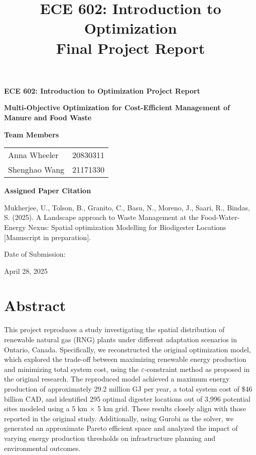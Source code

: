 \documentclass[12pt]{article}
\title{\textbf{ECE 602: Introduction to Optimization} \\ Final Project Report}
\date{}
\begin{document}
\begin{titlepage}
  \centering
  \vspace*{2cm}
  
  {\LARGE\bfseries ECE 602: Introduction to Optimization Project Report \par}
  \vspace{0.5cm}
  {\Large\bfseries Multi-Objective Optimization for Cost-Efficient Management of Manure and Food Waste \par}
  \vspace{2cm}
  
  {\large\bfseries Team Members\par}
  \vspace{0.5cm}
  \begin{tabular}{ll}
  Anna Wheeler & 20830311 \\
  Shenghao Wang & 21171330 \\

  \end{tabular}
  
  \vspace{2cm}
  
  {\large\bfseries Assigned Paper Citation\par}
  \vspace{0.5cm}
  \begin{minipage}{0.8\textwidth}
  \centering
  Mukherjee, U., Tolson, B., Granito, C., Basu, N., Moreno, J., Saari, R., Bindas, S. (2025). A Landscape approach to Waste Management at the Food-Water-Energy Nexus: Spatial optimization Modelling for Biodigester Locations [Manuscript in preparation].
  \end{minipage}
  
  \vfill
  
  {\large Date of Submission: \par}
  \vspace{0.5cm}
  {\large April 28, 2025\par}
  
\end{titlepage}

\section*{Abstract}
This project reproduces a study investigating the spatial distribution of renewable natural gas (RNG) plants under different adaptation scenarios in Ontario, Canada. Specifically, we reconstructed the original optimization model, which explored the trade-off between maximizing renewable energy production and minimizing total system cost, using the $\varepsilon$-constraint method as proposed in the original research. The reproduced model achieved a maximum energy production of approximately 29.2 million GJ per year, a total system cost of \$46 billion CAD, and identified 295 optimal digester locations out of 3,996 potential sites modeled using a 5 km $\times$ 5 km grid. These results closely align with those reported in the original study. Additionally, using Gurobi as the solver, we generated an approximate Pareto efficient space and analyzed the impact of varying energy production thresholds on infrastructure planning and environmental outcomes.
\end{document}
